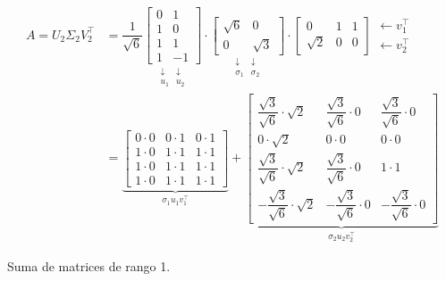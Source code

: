 \[\begin{aligned}
	A=U_2\Sigma_2V_2^\intercal&=\dfrac{1}{\sqrt{6}}\underset{\begin{array}{cc}
		\downarrow & \downarrow\\
		u_1 & u_2
\end{array}}{\begin{bmatrix}
0 &1 \\
1 & 0\\
1 & 1\\
1 & -1
\end{bmatrix}}\cdot\underset{\begin{array}{cc}
\downarrow & \downarrow\\
\sigma_1 & \sigma_2
\end{array}}{\begin{bmatrix}
\sqrt{6} & 0\\
0 & \sqrt{3}
\end{bmatrix}}\cdot\begin{bmatrix}
0 & 1 & 1\\
\sqrt{2} & 0 & 0
\end{bmatrix}\begin{array}{l}
\longleftarrow v_1^\intercal\\
\longleftarrow v_2^\intercal
\end{array}\\
&=\underbrace{\begin{bmatrix}
	0\cdot0 & 0\cdot1 & 0\cdot1 \\
	1\cdot0 & 1\cdot1 & 1\cdot1 \\
	1\cdot0 & 1\cdot1 & 1\cdot1 \\
	1\cdot0 & 1\cdot1 & 1\cdot1
\end{bmatrix}}_{\sigma_1u_1v_1^\intercal}+\underbrace{\begin{bmatrix}
\dfrac{\sqrt{3}}{\sqrt{6}}\cdot\sqrt{2} & \dfrac{\sqrt{3}}{\sqrt{6}}\cdot0 & \dfrac{\sqrt{3}}{\sqrt{6}}\cdot0 \\ 
0\cdot\sqrt{2} & 0\cdot0 & 0\cdot0 \\ 
\dfrac{\sqrt{3}}{\sqrt{6}}\cdot\sqrt{2} & \dfrac{\sqrt{3}}{\sqrt{6}}\cdot0 & 1\cdot1 \\ 
-\dfrac{\sqrt{3}}{\sqrt{6}}\cdot\sqrt{2} & -\dfrac{\sqrt{3}}{\sqrt{6}}\cdot0 & -\dfrac{\sqrt{3}}{\sqrt{6}}\cdot0
\end{bmatrix} }_{\sigma_2u_2v_2^\intercal}
\end{aligned}\]

Suma de matrices de rango 1.


